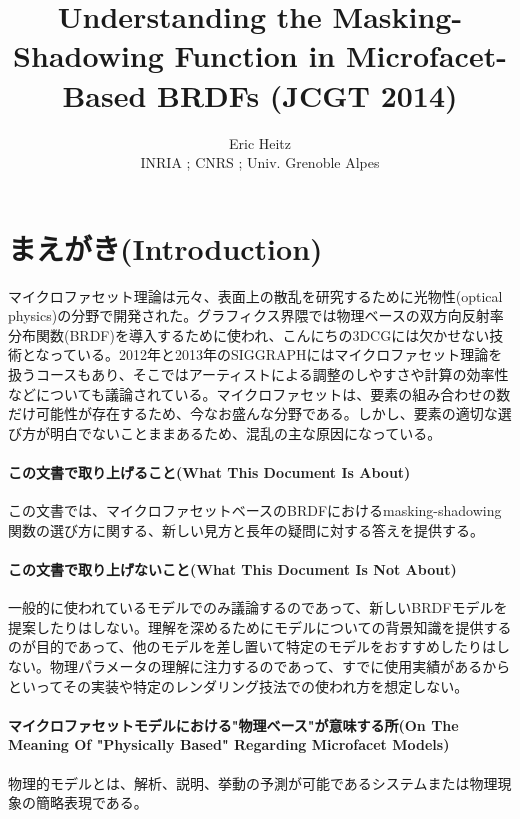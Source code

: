 \documentclass[a4j,xelatex,ja=standard]{bxjsarticle}
\title{Understanding the Masking-Shadowing Function in Microfacet-Based BRDFs (JCGT 2014)}
\author{Eric Heitz \\ INRIA ; CNRS ; Univ. Grenoble Alpes}
\begin{document}
\maketitle

\section{まえがき(Introduction)}

マイクロファセット理論は元々、表面上の散乱を研究するために光物性(optical physics)の分野で開発された\cite{Beckmann1963}。グラフィクス界隈では物理ベースの双方向反射率分布関数(BRDF)を導入するために使われ\cite{Cook1982,Oren1994,Walter2007}、こんにちの3DCGには欠かせない技術となっている。2012年と2013年のSIGGRAPHにはマイクロファセット理論を扱うコースもあり\cite{McAuley2012,McAuley2013}、そこではアーティストによる調整のしやすさや計算の効率性などについても議論されている。マイクロファセットは、要素の組み合わせの数だけ可能性が存在するため、今なお盛んな分野である。しかし、要素の適切な選び方が明白でないことままあるため、混乱の主な原因になっている。

\paragraph{この文書で取り上げること(What This Document Is About)}

この文書では、マイクロファセットベースのBRDFにおけるmasking-shadowing関数の選び方に関する、新しい見方と長年の疑問に対する答えを提供する。

\paragraph{この文書で取り上げないこと(What This Document Is Not About)}

一般的に使われているモデルでのみ議論するのであって、新しいBRDFモデルを提案したりはしない。理解を深めるためにモデルについての背景知識を提供するのが目的であって、他のモデルを差し置いて特定のモデルをおすすめしたりはしない。物理パラメータの理解に注力するのであって、すでに使用実績があるからといってその実装や特定のレンダリング技法での使われ方を想定しない。

\paragraph{マイクロファセットモデルにおける"物理ベース"が意味する所(On The Meaning Of "Physically Based" Regarding Microfacet Models)}

物理的モデルとは、解析、説明、挙動の予測が可能であるシステムまたは物理現象の簡略表現である。
\end{document}
